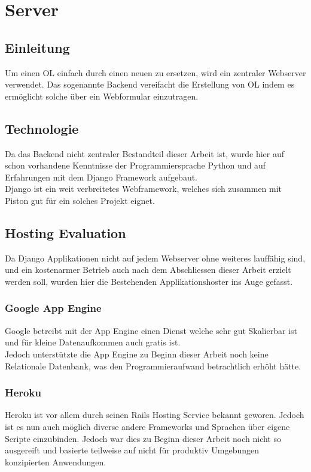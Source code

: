 
\newpage
\section{Server} %
\label{sec:Server}

\subsection{Einleitung} %
\label{sub:Einleitung}
Um einen OL einfach durch einen neuen zu ersetzen, wird ein zentraler Webserver verwendet. Das sogenannte Backend vereifacht die Erstellung von OL indem es ermöglicht solche über ein Webformular einzutragen.

\subsection{Technologie} %
\label{sub:Technologie}
Da das Backend nicht zentraler Bestandteil dieser Arbeit ist, wurde hier auf schon vorhandene Kenntnisse der Programmiersprache Python und auf Erfahrungen mit dem Django Framework aufgebaut.\\
Django ist ein weit verbreitetes Webframework, welches sich zusammen mit Piston gut für ein solches Projekt eignet.

\subsection{Hosting Evaluation} %
\label{sub:Hosting Evaluation}
Da Django Applikationen nicht auf jedem Webserver ohne weiteres lauffähig sind, und ein kostenarmer Betrieb auch nach dem Abschliessen dieser Arbeit erzielt werden soll, wurden hier die Bestehenden Applikationshoster ins Auge gefasst.

\subsubsection{Google App Engine} %
\label{ssub:Google App Engine}
Google betreibt mit der App Engine einen Dienst welche sehr gut Skalierbar ist und für kleine Datenaufkommen auch gratis ist.\\
Jedoch unterstützte die App Engine zu Beginn dieser Arbeit noch keine Relationale Datenbank, was den Programmieraufwand betrachtlich erhöht hätte.

\subsubsection{Heroku} %
\label{ssub:Heroku}
Heroku ist vor allem durch seinen Rails Hosting Service bekannt geworen. Jedoch ist es nun auch möglich diverse andere Frameworks und Sprachen über eigene Scripte einzubinden. Jedoch war dies zu Beginn dieser Arbeit noch nicht so ausgereift und basierte teilweise auf nicht für produktiv Umgebungen konzipierten Anwendungen.


